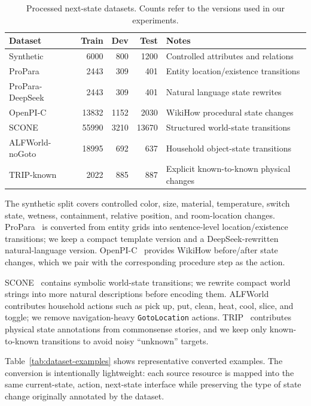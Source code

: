 \documentclass{article}
\begin{document}
\begin{table}[!htbp]
  \centering
  \caption{Processed next-state datasets. Counts refer to the versions used in our experiments.}
  \label{tab:datasets}
  \small
  \setlength{\tabcolsep}{3.5pt}
  \begin{tabular}{lrrrl}
    \toprule
    Dataset & Train & Dev & Test & Notes \\
    \midrule
    Synthetic & 6000 & 800 & 1200 & Controlled attributes and relations \\
    ProPara & 2443 & 309 & 401 & Entity location/existence transitions \\
    ProPara-DeepSeek & 2443 & 309 & 401 & Natural language state rewrites \\
    OpenPI-C & 13832 & 1152 & 2030 & WikiHow procedural state changes \\
    SCONE & 55990 & 3210 & 13670 & Structured world-state transitions \\
    ALFWorld-noGoto & 18995 & 692 & 637 & Household object-state transitions \\
    TRIP-known & 2022 & 885 & 887 & Explicit known-to-known physical changes \\
    \bottomrule
  \end{tabular}
\end{table}

The synthetic split covers controlled color, size, material, temperature, switch state, wetness, containment, relative position, and room-location changes. ProPara~\citep{dalvi2018propara} is converted from entity grids into sentence-level location/existence transitions; we keep a compact template version and a DeepSeek-rewritten natural-language version. OpenPI-C~\citep{wu2023openpic} provides WikiHow before/after state changes, which we pair with the corresponding procedure step as the action.

SCONE~\citep{long2016scone} contains symbolic world-state transitions; we rewrite compact world strings into more natural descriptions before encoding them. ALFWorld~\citep{shridhar2021alfworld} contributes household actions such as pick up, put, clean, heat, cool, slice, and toggle; we remove navigation-heavy \texttt{GotoLocation} actions. TRIP~\citep{storks2021trip} contributes physical state annotations from commonsense stories, and we keep only known-to-known transitions to avoid noisy ``unknown'' targets.

Table~\ref{tab:dataset-examples} shows representative converted examples. The conversion is intentionally lightweight: each source resource is mapped into the same current-state, action, next-state interface while preserving the type of state change originally annotated by the dataset.
\end{document}
